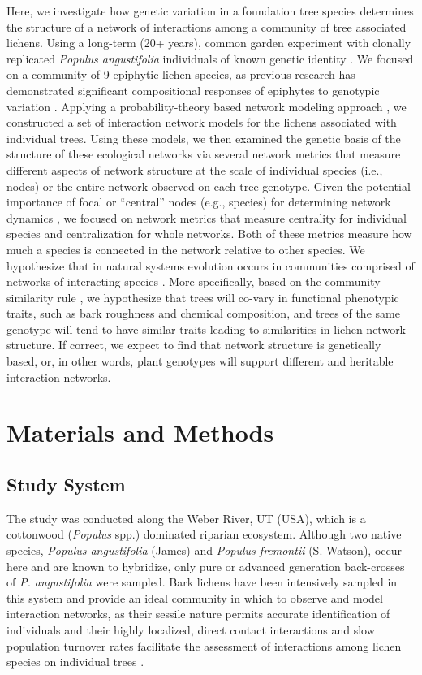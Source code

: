 \documentclass[fleqn,12pt]{olplainarticle}
\begin{document}
Here, we investigate how genetic variation in a foundation tree
species determines the structure of a network of interactions among a
community of tree associated lichens.  Using a long-term (20+ years),
common garden experiment with clonally replicated \textit{Populus
  angustifolia} individuals of known genetic identity
\citep{Martinsen2001HybridSpecies}. We focused on a community of 9
epiphytic lichen species, as previous research has demonstrated
significant compositional responses of epiphytes to genotypic
variation \citep{Winfree2011, Zytynska2011}. Applying a
probability-theory based network modeling approach \citep{Araujo2011},
we constructed a set of interaction network models for the lichens
associated with individual trees. Using these models, we then examined
the genetic basis of the structure of these ecological networks via
several network metrics that measure different aspects of network
structure at the scale of individual species (i.e., nodes) or the
entire network observed on each tree genotype. Given the potential
importance of focal or ``central'' nodes (e.g., species) for
determining network dynamics \citep{Lieberman2005EvolutionaryGraphs},
we focused on network metrics that measure centrality for individual
species and centralization for whole networks. Both of these metrics
measure how much a species is connected in the network relative to
other species. We hypothesize that in natural systems evolution occurs
in communities comprised of networks of interacting species
\citep{Lau2016afix, Keith2017, Thompson2013, Bascompte2006}. More
specifically, based on the community similarity rule
\cite{Bangert2006}, we hypothesize that trees will co-vary in
functional phenotypic traits, such as bark roughness and chemical
composition, and trees of the same genotype will tend to have similar
traits leading to similarities in lichen network structure. If
correct, we expect to find that network structure is genetically
based, or, in other words, plant genotypes will support different and
heritable interaction networks.


\section*{Materials and Methods}


\subsection*{Study System}

The study was conducted along the Weber River, UT (USA), which is a
cottonwood (\textit{Populus} spp.) dominated riparian
ecosystem. Although two native species, \textit{Populus angustifolia}
(James) and \textit{Populus fremontii} (S. Watson), occur here and are
known to hybridize, only pure or advanced generation back-crosses of
\textit{P. angustifolia} were sampled. Bark lichens have been
intensively sampled in this system and provide an ideal community in
which to observe and model interaction networks, as their sessile
nature permits accurate identification of individuals and their highly
localized, direct contact interactions and slow population turnover
rates facilitate the assessment of interactions among lichen species
on individual trees \citep{Lamit2015a}.
\end{document}
